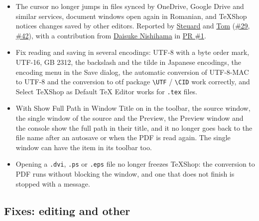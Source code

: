 \documentclass[11pt,letterpaper]{article}
\begin{document}
\begin{itemize}
\item The cursor no longer jumps in files synced by OneDrive, Google Drive and similar services, document windows open again in Romanian, and TeXShop notices changes saved by other editors. Reported by \href{https://github.com/Steuard}{Steuard} and \href{https://github.com/yo3iti}{Tom} (\href{https://github.com/TeXShopProject/TeXShop/issues/29}{\#29}, \href{https://github.com/TeXShopProject/TeXShop/issues/42}{\#42}), with a contribution from \href{https://github.com/ddd3h}{Daisuke Nishihama} in \href{https://github.com/TeXShopProject/TeXShop/pull/1}{PR \#1}.
\item Fix reading and saving in several encodings: UTF-8 with a byte order mark, UTF-16, GB 2312, the backslash and the tilde in Japanese encodings, the encoding menu in the Save dialog, the automatic conversion of UTF-8-MAC to UTF-8 and the conversion to otf package \texttt{\textbackslash{}UTF} / \texttt{\textbackslash{}CID} work correctly, and Select TeXShop as Default TeX Editor works for \texttt{.tex} files.
\item With Show Full Path in Window Title on in the toolbar, the source window, the single window of the source and the Preview, the Preview window and the console show the full path in their title, and it no longer goes back to the file name after an autosave or when the PDF is read again. The single window can have the item in its toolbar too.
\item Opening a \texttt{.dvi}, \texttt{.ps} or \texttt{.eps} file no longer freezes TeXShop: the conversion to PDF runs without blocking the window, and one that does not finish is stopped with a message.
\end{itemize}

\subsection{Fixes: editing and other}
\end{document}
